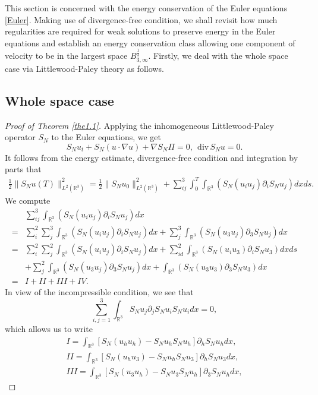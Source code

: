 \documentclass[11pt]{article}
\theoremstyle{plain}\newtheorem{definition}{Definition}[section]
\theoremstyle{definition}\newtheorem{theorem}{Theorem}[section]
\theoremstyle{plain}\newtheorem{lemma}[theorem]{Lemma}
\theoremstyle{plain}\newtheorem{coro}[theorem]{Corollary}
\theoremstyle{plain}\newtheorem{prop}[theorem]{Proposition}
\theoremstyle{remark}\newtheorem{remark}{Remark}[section]
\newcommand{\Div}{\mathrm{div}\,}
\newcommand{\be}{\begin{equation}}
\newcommand{\ee}{\end{equation}}
\newcommand{\ba}{\begin{aligned}}
\newcommand{\ea}{\end{aligned}}
\newcommand{\f}{\frac}
\newcommand{\ti}{\nabla}
\numberwithin{equation}{section}
\begin{document}
This section is concerned with the energy conservation of the Euler equations \eqref{Euler}. Making use of divergence-free condition, we shall  revisit how much regularities are required for   weak solutions to preserve energy in the Euler equations and establish an energy conservation class allowing one component  of velocity to be in the largest space $B_{3, \infty}^{\f13}$. Firstly, we deal with the whole space case via Littlewood-Paley theory as follows.
\subsection{Whole space case}
\begin{proof}[Proof of Theorem \ref{the1.1}]
Applying the inhomogeneous Littlewood-Paley operator $S_{N}$ to the Euler equations,
we get
$$
S_{N}u_{t}  + S_{N}(u\cdot\ti
u ) +\nabla S_{N}\Pi=0,  ~~
 \Div S_{N}u=0.$$
It follows from the energy estimate, divergence-free condition and
 integration by parts that
 \be\ba
 \f12\|S_{N}u(T)\|_{L^{2}(\mathbb{R}^{3})}^{2} = \f12\|S_{N}u_{0}\|_{L^{2}(\mathbb{R}^{3})}^{2}+\sum_{ij}^{3}\int_{0}^{T}\int_{\mathbb{R}^{3}}(S_{N}(u_{i}u_{j} )\partial_{i} S_{N}u_{j})dxds.
\ea\ee
We compute
\be\ba\label{3.2}
&\sum_{ij}^{3} \int_{\mathbb{R}^{3}}(S_{N}(u_{i}u_{j} )\partial_{i} S_{N}u_{j})dx \\
=&\sum_{ i}^{2}\sum_{ j}^{3} \int_{\mathbb{R}^{3}}(S_{N}(u_{i}u_{j} )\partial_{i} S_{N}u_{j})dx + \sum_{ j}^{3} \int_{\mathbb{R}^{3}}(S_{N}(u_{3}u_{j} )\partial_{3} S_{N}u_{j})dx
\\
=& \sum_{ i}^{2}\sum_{ j}^{2} \int_{\mathbb{R}^{3}}(S_{N}(u_{i}u_{j} )\partial_{i} S_{N}u_{j})dx +\sum_{ id}^{2} \int_{\mathbb{R}^{3}}(S_{N}(u_{i}u_{3} )\partial_{i} S_{N}u_{3})dxds\\&+ \sum_{ j}^{2} \int_{\mathbb{R}^{3}}(S_{N}(u_{3}u_{j} )\partial_{3} S_{N}u_{j})dx +  \int_{\mathbb{R}^{3}}(S_{N}(u_{3}u_{3} )\partial_{3} S_{N}u_{3})dx \\
=&I+II+III+IV.
\ea\ee
In view of the incompressible condition, we see that
$$
\sum_{i,j=1}^{3}\int_{\mathbb{R}^{3}} S_{N}u_{j} \partial_{j}S_{N} u_{i}
S_{N}u_{i} dx=0,
$$
which allows us to write
 \be\ba
 I=  \int_{\mathbb{R}^{3}} [S_{N}(u_{h}u_{h} )-S_{N} u_{h}S_{N}u_{h} ]\partial_{h} S_{N}u_{h} dx, \\
 II=   \int_{\mathbb{R}^{3}} [S_{N}(u_{h}u_{3} )-S_{N} u_{h}S_{N}u_{3} ]\partial_{h} S_{N}u_{3} dx, \\
 III=  \int_{\mathbb{R}^{3}} [S_{N}(u_{3}u_{h} )-S_{N} u_{3}S_{N} u_{h} ]\partial_{3} S_{N}u_{h} dx,
\ea\ee

\end{proof}
\end{document}
